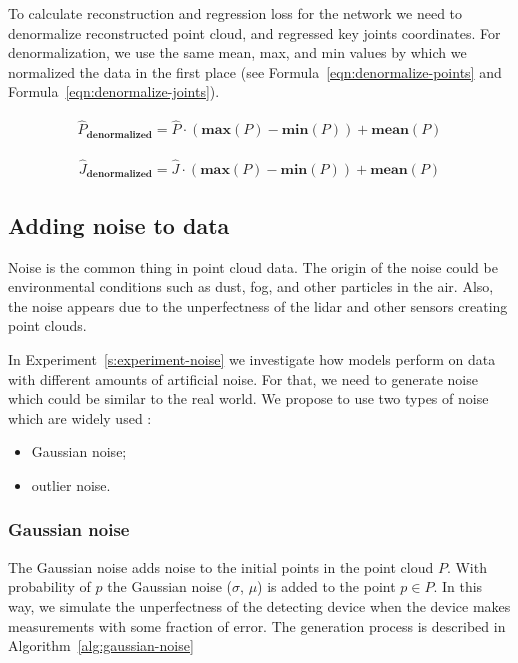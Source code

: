To calculate reconstruction and regression loss for the network we need to denormalize reconstructed point cloud, and regressed key joints coordinates. For denormalization, we use the same mean, max, and min values by which we normalized the data in the first place (see Formula~\ref{eqn:denormalize-points} and Formula~\ref{eqn:denormalize-joints}).

\begin{equation}
    \begin{aligned}
        \hat{P}_{\textbf{denormalized}} = \hat{P} \cdot (\textbf{max}(P) - \textbf{min}(P)) + \textbf{mean}(P)
    \end{aligned}
\label{eqn:denormalize-points}
\end{equation}

\begin{equation}
    \begin{aligned}
        \hat{J}_{\textbf{denormalized}} = \hat{J} \cdot (\textbf{max}(P) - \textbf{min}(P)) + \textbf{mean}(P)
    \end{aligned}
\label{eqn:denormalize-joints}
\end{equation}


\subsection{Adding noise to data}
\label{s:adding-noise-to-data}
Noise is the common thing in point cloud data. The origin of the noise could be environmental conditions such as dust, fog, and other particles in the air. Also, the noise appears due to the unperfectness of the lidar and other sensors creating point clouds.

In Experiment~\ref{s:experiment-noise} we investigate how models perform on data with different amounts of artificial noise. For that, we need to generate noise which could be similar to the real world. We propose to use two types of noise which are widely used \parencite{hermosilla_total_2019,lv_point_2020,rakotosaona_pointcleannet_2020}:
\begin{itemize}
  \item Gaussian noise;
  \item outlier noise.
\end{itemize}

\subsubsection{Gaussian noise}
The Gaussian noise adds noise to the initial points in the point cloud $P$. With probability of $p$ the Gaussian noise ($\sigma$, $\mu$) is added to the point $p \in P$. In this way, we simulate the unperfectness of the detecting device when the device makes measurements with some fraction of error. The generation process is described in Algorithm~\ref{alg:gaussian-noise}

